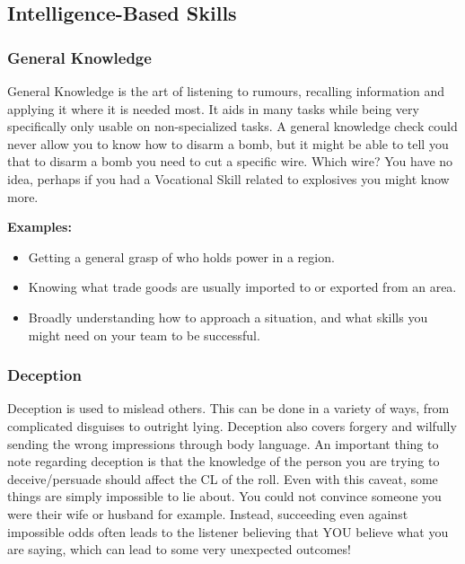 \subsection{Intelligence-Based Skills} \label{subsec:intelligence-based_skills}

\subsubsection{General Knowledge} \label{subsubsec:general_knowledge}

General Knowledge is the art of listening to rumours, recalling information and applying it where it is needed most. It aids in many tasks while being very specifically only usable on non-specialized tasks. A general knowledge check could never allow you to know how to disarm a bomb, but it might be able to tell you that to disarm a bomb you need to cut a specific wire. Which wire? You have no idea, perhaps if you had a Vocational Skill related to explosives you might know more.

\begin{displayquote}
    \textbf{Examples:}
    \begin{itemize}
        \item Getting a general grasp of who holds power in a region.
        \item Knowing what trade goods are usually imported to or exported from an area.
        \item Broadly understanding how to approach a situation, and what skills you might need on your team to be successful.
    \end{itemize}
\end{displayquote}

\subsubsection{Deception} \label{subsubsec:deception}

Deception is used to mislead others. This can be done in a variety of ways, from complicated disguises to outright lying. Deception also covers forgery and wilfully sending the wrong impressions through body language. An important thing to note regarding deception is that the knowledge of the person you are trying to deceive/persuade should affect the CL of the roll. Even with this caveat, some things are simply impossible to lie about. You could not convince someone you were their wife or husband for example. Instead, succeeding even against impossible odds often leads to the listener believing that YOU believe what you are saying, which can lead to some very unexpected outcomes!

